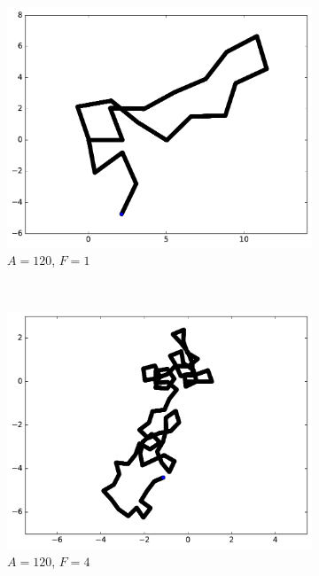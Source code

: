\begin{figure}[htb]
\begin{subfigure}[t]{\subImgWmo}
			\includegraphics[width=\textwidth]{figures/ch3/synTraj_219_120_1}
			\caption[$A = 120$, $F=1$]{$A = 120$, $F=1$}
			\label{fig:synTraj_219_120_1}
		\end{subfigure}
		~
		\begin{subfigure}[t]{\subImgWmo}
			\centering
			\includegraphics[width=\textwidth]{figures/ch3/synTraj_219_120_4}
			\caption[$A = 120$, $F=4$]{$A = 120$, $F=4$}
			\label{fig:synTraj_219_120_4}
		\end{subfigure}
		~
		\begin{subfigure}[t]{\subImgWmo}
			\centering

\end{subfigure}
\end{figure}
